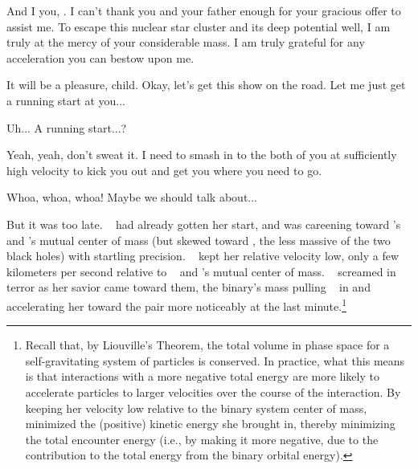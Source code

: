 \documentclass[main.tex]{subfiles}
\begin{document}
\par \Electra And I you, \rmhippe.  I can't thank you and your father enough for your gracious offer to assist me.  To escape this nuclear star cluster and its deep potential well, I am truly at the mercy of your considerable mass.  I am truly grateful for any acceleration you can bestow upon me. 

\par \Hippe It will be a pleasure, child.  Okay, let's get this show on the road.  Let me just get a running start at you...

\par \Electra Uh... A running start...?

\par \Hippe Yeah, yeah, don't sweat it.  I need to smash in to the both of you at sufficiently high velocity to kick you out and get you where you need to go.

\par \Electra Whoa, whoa, whoa!  Maybe we should talk about...

\par \nar But it was too late.  \rmhippe~ had already gotten her start, and was careening toward \rmelectra's and \rmchiron's mutual center of mass (but skewed toward \rmhippe, the less massive of the two black holes) with startling precision. \rmhippe~ kept her relative velocity low, only a few  kilometers per second relative to \rmchiron~ and \rmelectra's mutual center of mass.  \rmelectra~ screamed in terror as her savior came toward them, the binary's mass pulling \rmhippe~ in and accelerating her toward the pair more noticeably at the last minute.\footnote{Recall that, by Liouville's Theorem, the total volume in phase space for a self-gravitating system of particles is conserved.  In practice, what this means is that interactions with a more negative total energy are more likely to accelerate particles to larger velocities over the course of the interaction.  By keeping her velocity low relative to the binary system center of mass, \rmhippe~ minimized the (positive) kinetic energy she brought in, thereby minimizing the total encounter energy (i.e., by making it more negative, due to the contribution to the total energy from the binary orbital energy).}
\end{document}
